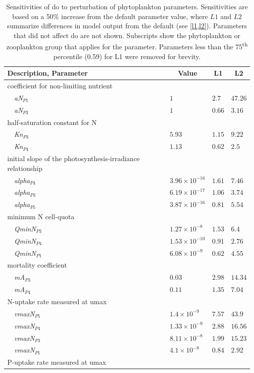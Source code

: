 \documentclass[letterpaper,12pt,oneside]{article}\usepackage[]{graphicx}\usepackage[]{color}
\begin{document}
\begin{table}[!tbp]
{\normalsize
\caption{Sensitivities of \ac{do} to perturbation of phytoplankton parameters.  Sensitivities are based on a 50\% increase from the default parameter value, where $L1$ and $L2$ summarize differences in model output from the default (see \cref{l1,l2}).  Parameters that did not affect \ac{do} are not shown.  Subscripts show the phytoplankton or zooplankton group that applies for the parameter. Parameters less than the 75\textsuperscript{th} percentile (0.59) for L1 were removed for brevity.\label{tab:phytosens}} 
\begin{center}
\begin{tabular}{llll}
\hline\hline
\multicolumn{1}{l}{Description, Parameter}&\multicolumn{1}{c}{Value}&\multicolumn{1}{c}{L1}&\multicolumn{1}{c}{L2}\tabularnewline
\hline
{coefficient for non-limiting nutrient}&&&\tabularnewline
~~\textit{aN$_{P1}$}&$1$&$2.7$&$47.26$\tabularnewline
~~\textit{aN$_{P3}$}&$1$&$0.66$&$3.16$\tabularnewline
\hline
{half-saturation constant for N}&&&\tabularnewline
~~\textit{Kn$_{P3}$}&$5.93$&$1.15$&$9.22$\tabularnewline
~~\textit{Kn$_{P4}$}&$1.13$&$0.62$&$2.5$\tabularnewline
\hline
{initial slope of the photosynthesis-irradiance relationship}&&&\tabularnewline
~~\textit{alpha$_{P4}$}&$3.96\times 10^{-16}$&$1.61$&$7.46$\tabularnewline
~~\textit{alpha$_{P3}$}&$6.19\times 10^{-17}$&$1.06$&$3.74$\tabularnewline
~~\textit{alpha$_{P5}$}&$3.87\times 10^{-16}$&$0.81$&$5.54$\tabularnewline
\hline
{minimum N cell-quota}&&&\tabularnewline
~~\textit{QminN$_{P3}$}&$1.27\times 10^{-8}$&$1.53$&$6.4$\tabularnewline
~~\textit{QminN$_{P4}$}&$1.53\times 10^{-10}$&$0.91$&$2.76$\tabularnewline
~~\textit{QminN$_{P1}$}&$6.08\times 10^{-9}$&$0.62$&$4.55$\tabularnewline
\hline
{mortality coefficient}&&&\tabularnewline
~~\textit{mA$_{P3}$}&$0.03$&$2.98$&$14.34$\tabularnewline
~~\textit{mA$_{P4}$}&$0.11$&$1.35$&$7.04$\tabularnewline
\hline
{N-uptake rate measured at umax}&&&\tabularnewline
~~\textit{vmaxN$_{P5}$}&$1.4\times 10^{-9}$&$7.57$&$43.9$\tabularnewline
~~\textit{vmaxN$_{P4}$}&$1.33\times 10^{-9}$&$2.88$&$16.56$\tabularnewline
~~\textit{vmaxN$_{P3}$}&$8.11\times 10^{-8}$&$1.99$&$15.23$\tabularnewline
~~\textit{vmaxN$_{P1}$}&$4.1\times 10^{-8}$&$0.84$&$2.92$\tabularnewline
\hline
{P-uptake rate measured at umax}&&&\tabularnewline

\end{tabular}
\end{center}}
\end{table}
\end{document}
